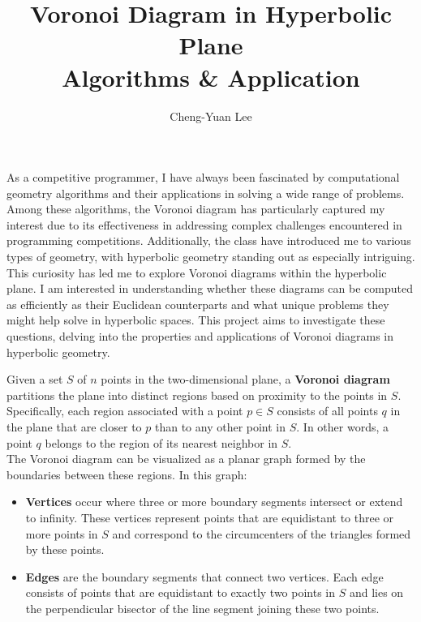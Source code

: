 \documentclass[minted, draw]{hebdomon}
\begin{document}
\title{Voronoi Diagram in Hyperbolic Plane\\ Algorithms \& Application}
\date{Cheng-Yuan Lee}

\maketitle
\dominitoc
\tableofcontents
\newpage


As a competitive programmer, I have always been fascinated by computational geometry algorithms and their applications in solving a wide range of problems. Among these algorithms, the Voronoi diagram has particularly captured my interest due to its effectiveness in addressing complex challenges encountered in programming competitions. Additionally, the class have introduced me to various types of geometry, with hyperbolic geometry standing out as especially intriguing. \\

This curiosity has led me to explore Voronoi diagrams within the hyperbolic plane. I am interested in understanding whether these diagrams can be computed as efficiently as their Euclidean counterparts and what unique problems they might help solve in hyperbolic spaces. This project aims to investigate these questions, delving into the properties and applications of Voronoi diagrams in hyperbolic geometry.



Given a set \( S \) of \( n \) points in the two-dimensional plane, a \textbf{Voronoi diagram} partitions the plane into distinct regions based on proximity to the points in \( S \). Specifically, each region associated with a point \( p \in S \) consists of all points \( q \) in the plane that are closer to \( p \) than to any other point in \( S \). In other words, a point \( q \) belongs to the region of its nearest neighbor in \( S \). \\

The Voronoi diagram can be visualized as a planar graph formed by the boundaries between these regions. In this graph:
\begin{itemize}
    \item \textbf{Vertices} occur where three or more boundary segments intersect or extend to infinity. These vertices represent points that are equidistant to three or more points in \( S \) and correspond to the circumcenters of the triangles formed by these points.
    \item \textbf{Edges} are the boundary segments that connect two vertices. Each edge consists of points that are equidistant to exactly two points in \( S \) and lies on the perpendicular bisector of the line segment joining these two points.
\end{itemize}
\end{document}
